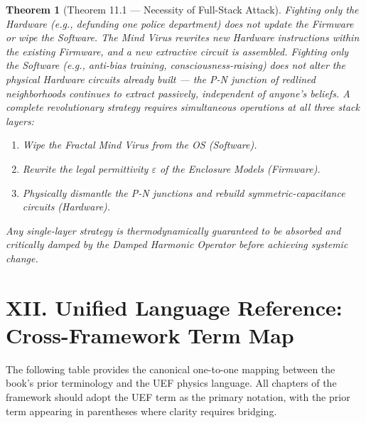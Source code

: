 \documentclass[12pt]{book}
\numberwithin{equation}{chapter}
\newtheorem{theorem}{Theorem}[chapter]
\begin{document}
\begin{theorem}[Theorem 11.1 — Necessity of Full-Stack Attack]
Fighting only the Hardware (e.g., defunding one police department) does not update the Firmware or wipe the Software. The Mind Virus rewrites new Hardware instructions within the existing Firmware, and a new extractive circuit is assembled. Fighting only the Software (e.g., anti-bias training, consciousness-raising) does not alter the physical Hardware circuits already built — the P-N junction of redlined neighborhoods continues to extract passively, independent of anyone's beliefs. A complete revolutionary strategy requires simultaneous operations at all three stack layers:
    
\begin{enumerate}

\item Wipe the Fractal Mind Virus from the OS (Software).

\item Rewrite the legal permittivity $\varepsilon$ of the Enclosure Models (Firmware).

\item Physically dismantle the P-N junctions and rebuild symmetric-capacitance circuits (Hardware).

\end{enumerate}

    Any single-layer strategy is thermodynamically guaranteed to be absorbed and critically damped by the Damped Harmonic Operator before achieving systemic change.
  \end{theorem}

\section{XII. Unified Language Reference: Cross-Framework Term Map}

    The following table provides the canonical one-to-one mapping between the book's prior terminology and the UEF physics language. All chapters of the framework should adopt the UEF term as the primary notation, with the prior term appearing in parentheses where clarity requires bridging.
  
\end{document}
